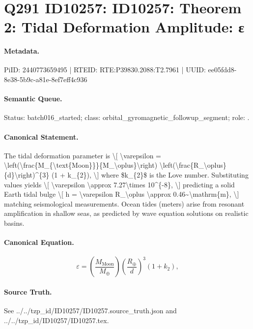 \section*{Q291 ID10257: ID10257: Theorem 2: Tidal Deformation Amplitude: ε}
\paragraph{Metadata.}
PiID: 2440773659495 | RTEID: RTE:P39830.2088:T2.7961 | UUID: ee05fdd8-8e38-5b9c-a81e-8ef7eff4c936

\paragraph{Semantic Queue.}
Status: batch016\_started; class: orbital\_gyromagnetic\_followup\_segment; role: .

\paragraph{Canonical Statement.}
The tidal deformation parameter is \textbackslash{}[ \textbackslash{}varepsilon = \textbackslash{}left(\textbackslash{}frac\{M\_\{\textbackslash{}text\{Moon\}\}\}\{M\_\textbackslash{}oplus\}\textbackslash{}right) \textbackslash{}left(\textbackslash{}frac\{R\_\textbackslash{}oplus\}\{d\}\textbackslash{}right)\textasciicircum{}\{3\} (1 + k\_\{2\}), \textbackslash{}] where \$k\_\{2\}\$ is the Love number. Substituting values yields \textbackslash{}[ \textbackslash{}varepsilon \textbackslash{}approx 7.27\textbackslash{}times 10\textasciicircum{}\{-8\}, \textbackslash{}] predicting a solid Earth tidal bulge \textbackslash{}[ h = \textbackslash{}varepsilon R\_\textbackslash{}oplus \textbackslash{}approx 0.46\textasciitilde{}\textbackslash{}mathrm\{m\}, \textbackslash{}] matching seismological measurements. Ocean tides (meters) arise from resonant amplification in shallow seas, as predicted by wave equation solutions on realistic basins.

\paragraph{Canonical Equation.}
\[
\varepsilon = \left(\frac{M_{\text{Moon}}}{M_\oplus}\right) \left(\frac{R_\oplus}{d}\right)^{3} (1 + k_{2}),
\]

\paragraph{Source Truth.}
See ../../tzp\_id/ID10257/ID10257.source\_truth.json and ../../tzp\_id/ID10257/ID10257.tex.
